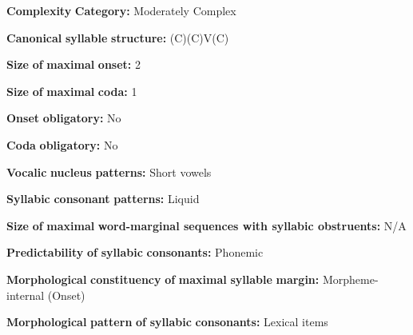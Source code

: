 \begin{styleBody}
\textbf{Complexity} \textbf{Category:} Moderately Complex
\end{styleBody}

\begin{styleBody}
\textbf{Canonical} \textbf{syllable} \textbf{structure:} (C)(C)V(C) \citep[54-72]{Slater2003}
\end{styleBody}

\begin{styleBody}
\textbf{Size} \textbf{of} \textbf{maximal} \textbf{onset:} 2
\end{styleBody}

\begin{styleBody}
\textbf{Size} \textbf{of} \textbf{maximal} \textbf{coda:} 1
\end{styleBody}

\begin{styleBody}
\textbf{Onset} \textbf{obligatory:} No
\end{styleBody}

\begin{styleBody}
\textbf{Coda} \textbf{obligatory:} No
\end{styleBody}

\begin{styleBody}
\textbf{Vocalic} \textbf{nucleus} \textbf{patterns:} Short vowels
\end{styleBody}

\begin{styleBody}
\textbf{Syllabic} \textbf{consonant} \textbf{patterns:} Liquid
\end{styleBody}

\begin{styleBody}
\textbf{Size} \textbf{of} \textbf{maximal} \textbf{word{}-marginal sequences with syllabic obstruents:} N/A
\end{styleBody}

\begin{styleBody}
\textbf{Predictability} \textbf{of} \textbf{syllabic} \textbf{consonants:} Phonemic
\end{styleBody}

\begin{styleBody}
\textbf{Morphological} \textbf{constituency} \textbf{of} \textbf{maximal} \textbf{syllable} \textbf{margin:} Morpheme-internal (Onset)
\end{styleBody}

\begin{styleBody}
\textbf{Morphological} \textbf{pattern} \textbf{of} \textbf{syllabic} \textbf{consonants:} Lexical items
\end{styleBody}

